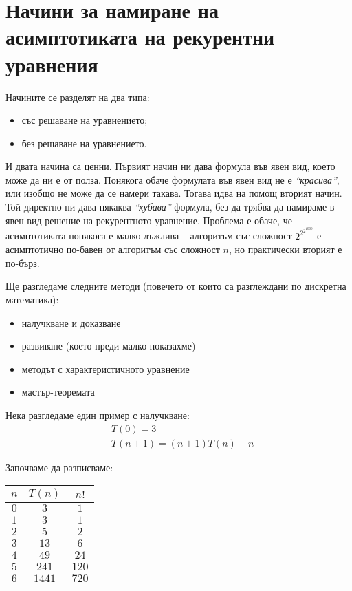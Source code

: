 \section{Начини за намиране на асимптотиката на рекурентни уравнения}

Начините се разделят на два типа:
\begin{itemize}
    \item със решаване на уравнението;
    \item без решаване на уравнението.
\end{itemize}

И двата начина са ценни.
Първият начин ни дава формула във явен вид, което може да ни е от полза.
Понякога обаче формулата във явен вид не е \textit{``красива''}, или изобщо не може да се намери такава.
Тогава идва на помощ вторият начин.
Той директно ни дава някаква \textit{``хубава''} формула, без да трябва да намираме в явен вид решение на рекурентното уравнение.
Проблема е обаче, че асимптотиката понякога е малко лъжлива -- алгоритъм със сложност $2^{2^{2^{1000}}}$ е асимптотично по-бавен от алгоритъм със сложност $n$, но практически вторият е по-бърз.

Ще разгледаме следните методи (повечето от които са разглеждани по дискретна математика):
\begin{itemize}
    \item налучкване и доказване
    \item развиване (което преди малко показахме)
    \item методът с характеристичното уравнение
    \item мастър-теоремата
\end{itemize}

Нека разгледаме един пример с налучкване:
\begin{align*}
     & T(0) = 3                   \\
     & T(n + 1) = (n + 1)T(n) - n
\end{align*}

Започваме да разписваме:
\begin{center}
    \begin{tabular}{| c | c | c |}
        \hline
        $n$ & $T(n)$ & $n!$  \\
        \hline
        $0$ & $3$    & $1$   \\
        \hline
        $1$ & $3$    & $1$   \\
        \hline
        $2$ & $5$    & $2$   \\
        \hline
        $3$ & $13$   & $6$   \\
        \hline
        $4$ & $49$   & $24$  \\
        \hline
        $5$ & $241$  & $120$ \\
        \hline
        $6$ & $1441$ & $720$ \\
        \hline
    \end{tabular}
\end{center}

